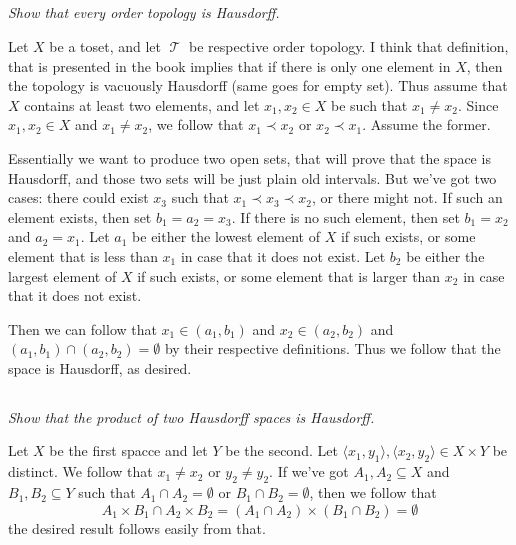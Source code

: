 \documentclass[11pt,oneside,titlepage]{book}
\DeclareMathOperator \topol {\mathcal {T}}
\newcommand{\eangle}[1]{\langle #1 \rangle}
\begin{document}
\subsection{}

\textit{Show that every order topology is Hausdorff.}

Let $X$ be a toset, and let $\topol$ be respective order topology.
I think that definition, that is presented in the book implies that if there is only one element
in $X$, then the topology is vacuously Hausdorff (same goes for empty set).
Thus assume that $X$ contains at least two elements, and let $x_1, x_2 \in X$ be such
that $x_1 \neq x_2$. Since $x_1, x_2 \in X$ and $x_1 \neq x_2$, we follow
that $x_1 \prec x_2$ or $x_2 \prec x_1$. Assume the former.

Essentially we want to
produce two open sets, that will prove that the space is Hausdorff, and
those two sets will be just plain old intervals. But we've got two cases:
there could exist $x_3$ such that $x_1 \prec x_3 \prec x_2$, or there might not.
If such an element exists, then set $b_1 = a_2 = x_3$. If there is no such element, then
set $b_1 = x_2$ and $a_2 = x_1$. 
Let $a_1$ be either the lowest element of $X$ if such exists, or some element that
is less than $x_1$ in case that it does not exist.
Let $b_2$ be either the largest element of $X$ if such exists, or some element that
is larger than $x_2$ in case that it does not exist.

Then we can follow that $x_1 \in (a_1, b_1)$ and $x_2 \in (a_2, b_2)$ and
$(a_1, b_1) \cap (a_2, b_2) = \emptyset$ by their respective definitions.
Thus we follow that the space is Hausdorff, as desired.

\subsection{}

\textit{Show that the product of two Hausdorff spaces is Hausdorff.}

Let $X$ be the first spacce and let $Y$ be the second.
Let $\eangle{x_1, y_1}, \eangle{x_2, y_2} \in X \times Y$ be distinct.
We follow that $x_1 \neq x_2$ or $y_2 \neq y_2$. 
If we've got $A_1, A_2 \subseteq X$ and $B_1, B_2 \subseteq Y$ such that
$A_1 \cap A_2 = \emptyset$ or $B_1 \cap B_2 =  \emptyset$, then we follow that
$$A_1 \times B_1 \cap A_2 \times B_2 = (A_1 \cap A_2) \times (B_1 \cap B_2) = \emptyset$$
the desired result follows easily from that.

\subsection{}
\end{document}
